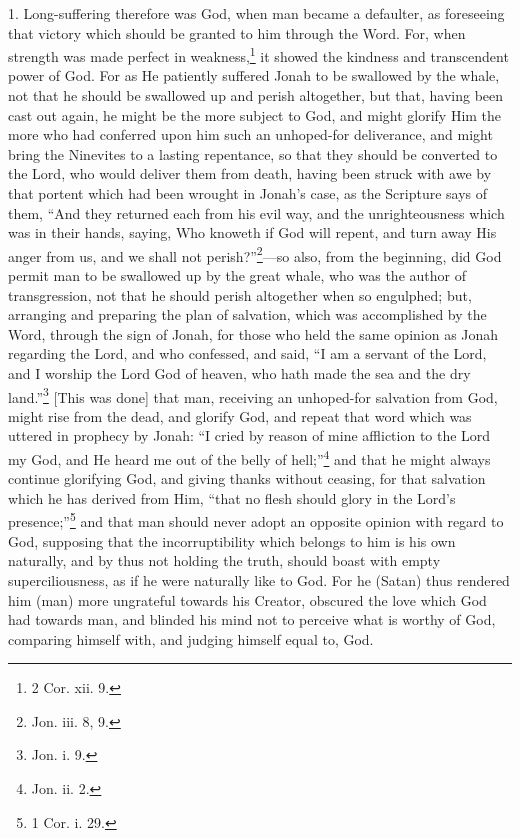 1. Long-suffering therefore was God, when man became a defaulter, as foreseeing that victory which should be granted to him through the Word. For, when strength was made perfect in weakness,\footnote{2 Cor. xii. 9.} it showed the kindness and transcendent power of God. For as He patiently suffered Jonah to be swallowed by the whale, not that he should be swallowed up and perish altogether, but that, having been cast out again, he might be the more subject to God, and might glorify Him the more who had conferred upon him such an unhoped-for deliverance, and might bring the Ninevites to a lasting repentance, so that they should be converted to the Lord, who would deliver them from death, having been struck with awe by that portent which had been wrought in Jonah’s case, as the Scripture says of them, “And they returned each from his evil way, and the unrighteousness which was in their hands, saying, Who knoweth if God will repent, and turn away His anger from us, and we shall not perish?”\footnote{Jon. iii. 8, 9.}—so also, from the beginning, did God permit man to be  swallowed up by the great whale, who was the author of transgression, not that he should perish altogether when so engulphed; but, arranging and preparing the plan of salvation, which was accomplished by the Word, through the sign of Jonah, for those who held the same opinion as Jonah regarding the Lord, and who confessed, and said, “I am a servant of the Lord, and I worship the Lord God of heaven, who hath made the sea and the dry land.”\footnote{Jon. i. 9.} [This was done] that man, receiving an unhoped-for salvation from God, might rise from the dead, and glorify God, and repeat that word which was uttered in prophecy by Jonah: “I cried by reason of mine affliction to the Lord my God, and He heard me out of the belly of hell;”\footnote{Jon. ii. 2.} and that he might always continue glorifying God, and giving thanks without ceasing, for that salvation which he has derived from Him, “that no flesh should glory in the Lord’s presence;”\footnote{1 Cor. i. 29.} and that man should never adopt an opposite opinion with regard to God, supposing that the incorruptibility which belongs to him is his own naturally, and by thus not holding the truth, should boast with empty superciliousness, as if he were naturally like to God. For he (Satan) thus rendered him (man) more ungrateful towards his Creator, obscured the love which God had towards man, and blinded his mind not to perceive what is worthy of God, comparing himself with, and judging himself equal to, God.


